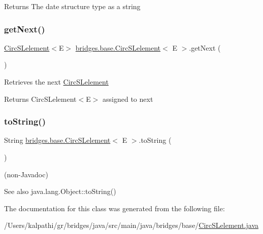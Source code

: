 \begin{DoxyReturn}{Returns}
The date structure type as a string 
\end{DoxyReturn}
\mbox{\label{classbridges_1_1base_1_1_circ_s_lelement_ae18b07e3f1d37b5eca0cae22efc0d395}} 
\subsubsection{\texorpdfstring{getNext()}{getNext()}}
{\footnotesize\ttfamily \mbox{\hyperlink{classbridges_1_1base_1_1_circ_s_lelement}{Circ\+S\+Lelement}}$<$E$>$ \mbox{\hyperlink{classbridges_1_1base_1_1_circ_s_lelement}{bridges.\+base.\+Circ\+S\+Lelement}}$<$ E $>$.get\+Next (\begin{DoxyParamCaption}{ }\end{DoxyParamCaption})}

Retrieves the next \mbox{\hyperlink{classbridges_1_1base_1_1_circ_s_lelement}{Circ\+S\+Lelement}}

\begin{DoxyReturn}{Returns}
Circ\+S\+Lelement$<$\+E$>$ assigned to next 
\end{DoxyReturn}
\mbox{\label{classbridges_1_1base_1_1_circ_s_lelement_af307188926766e73efb988f102ce9740}} 
\subsubsection{\texorpdfstring{toString()}{toString()}}
{\footnotesize\ttfamily String \mbox{\hyperlink{classbridges_1_1base_1_1_circ_s_lelement}{bridges.\+base.\+Circ\+S\+Lelement}}$<$ E $>$.to\+String (\begin{DoxyParamCaption}{ }\end{DoxyParamCaption})}

(non-\/\+Javadoc)

\begin{DoxySeeAlso}{See also}
java.\+lang.\+Object\+::to\+String() 
\end{DoxySeeAlso}


The documentation for this class was generated from the following file\+:\begin{DoxyCompactItemize}
\item 
/\+Users/kalpathi/gr/bridges/java/src/main/java/bridges/base/\mbox{\hyperlink{_circ_s_lelement_8java}{Circ\+S\+Lelement.\+java}}\end{DoxyCompactItemize}
